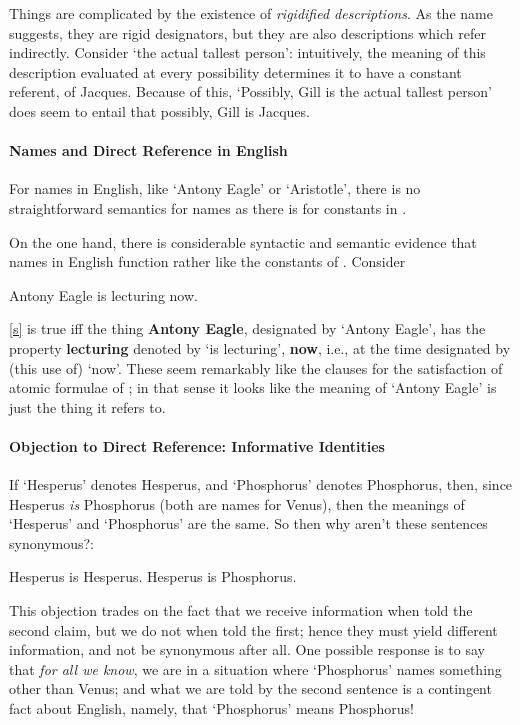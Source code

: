 Things are complicated by the existence of \emph{rigidified descriptions}. As the name suggests, they are rigid designators, but they are also descriptions which refer indirectly. Consider ‘the actual tallest person’: intuitively, the meaning of this description evaluated at every possibility determines it to have a constant referent, of Jacques. Because of this, ‘Possibly, Gill is the actual tallest person’ does seem to entail that possibly, Gill is Jacques. 
	


\paragraph{Names and Direct Reference in English}

For names in English, like `Antony Eagle' or `Aristotle', there is no straightforward semantics for names as there is for constants in \ltwo.

On the one hand, there is considerable syntactic and semantic evidence that names in English function rather like the constants of \ltwo. Consider \begin{exe}
	\ex Antony Eagle is lecturing now.\label{s}
\end{exe}  \ref{s} is true  iff the thing \textbf{Antony Eagle}, designated by `Antony Eagle', has the property \textbf{lecturing} denoted by `is lecturing', \textbf{now}, i.e., at the time designated by (this use of) `now'. These seem remarkably like the clauses for the satisfaction of atomic formulae of \ltwo; in that sense it looks like the meaning of `Antony Eagle' is just the thing it refers to.

\paragraph{Objection to Direct Reference: Informative Identities}
 If `Hesperus' denotes Hesperus, and `Phosphorus' denotes Phosphorus, then, since Hesperus \emph{is} Phosphorus (both are names for Venus), then the meanings of `Hesperus' and `Phosphorus' are the same. So then why aren't these sentences synonymous?: \begin{exe}
		\ex Hesperus is Hesperus.
		\ex Hesperus is Phosphorus.
	\end{exe}



This objection trades on the fact that we receive information when told the second claim, but we do not when told the first; hence they must yield different information, and not be synonymous after all. One possible response is to say that \emph{for all we know}, we are in a situation where `Phosphorus' names something other than Venus; and what we are told by the second sentence is a contingent fact about English, namely, that `Phosphorus' means Phosphorus!

